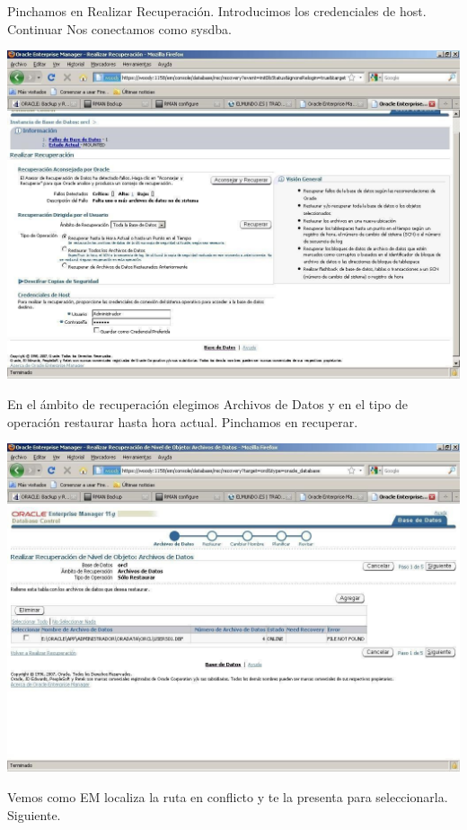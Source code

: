 \documentclass[12pt,letterpaper]{article}
\begin{document}
Pinchamos en Realizar Recuperación. Introducimos los credenciales de host. Continuar Nos conectamos como sysdba.

\newpage
\includegraphics[width=14cm]{./IMG/img42.jpg}

En el ámbito de recuperación elegimos Archivos de Datos y en el tipo de operación restaurar hasta hora actual. Pinchamos en recuperar.

\newpage
\includegraphics[width=14cm]{./IMG/img43.jpg}

Vemos  como  EM  localiza  la  ruta  en  conflicto  y  te  la  presenta  para  seleccionarla. Siguiente.
\end{document}
